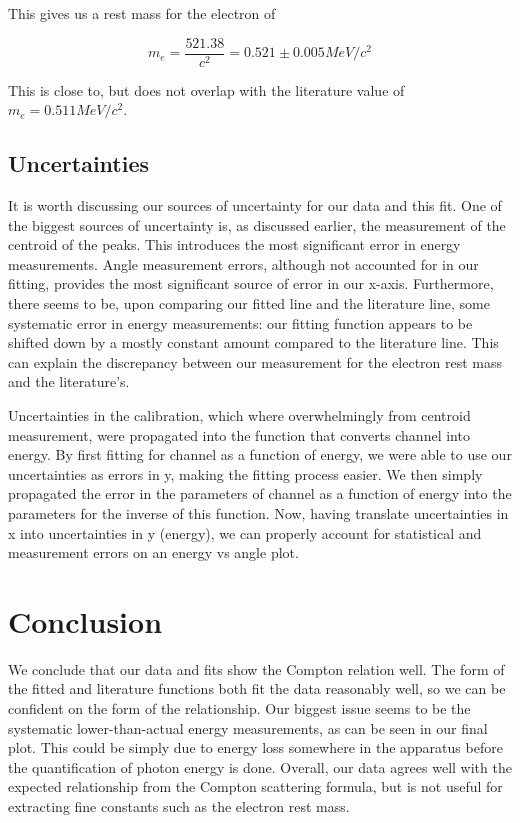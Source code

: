 \documentclass{article}
\begin{document}
This gives us a rest mass for the electron of

\begin{equation}
	m_e = \frac{521.38}{c^2} = 0.521 \pm 0.005 MeV/c^2 
\end{equation}

This is close to, but does not overlap with the literature value of $m_e = 0.511 MeV/c^2$.

\subsection{Uncertainties}
It is worth discussing our sources of uncertainty for our data and this fit. One of the biggest sources of uncertainty is, as discussed earlier, the measurement of the centroid of the peaks. This introduces the most significant error in energy measurements. Angle measurement errors, although not accounted for in our fitting, provides the most significant source of error in our x-axis. Furthermore, there seems to be, upon comparing our fitted line and the literature line, some systematic error in energy measurements: our fitting function appears to be shifted down by a mostly constant amount compared to the literature line. This can explain the discrepancy between our measurement for the electron rest mass and the literature's.

\hspace{.25cm}

Uncertainties in the calibration, which where overwhelmingly from centroid measurement, were propagated into the function that converts channel into energy. By first fitting for channel as a function of energy, we were able to use our uncertainties as errors in y, making the fitting process easier. We then simply propagated the error in the parameters of channel as a function of energy into the parameters for the inverse of this function. Now, having translate uncertainties in x into uncertainties in y (energy), we can properly account for statistical and measurement errors on an energy vs angle plot.

\section{Conclusion}

We conclude that our data and fits show the Compton relation well. The form of the fitted and literature functions both fit the data reasonably well, so we can be confident on the form of the relationship. Our biggest issue seems to be the systematic lower-than-actual energy measurements, as can be seen in our final plot. This could be simply due to energy loss somewhere in the apparatus before the quantification of photon energy is done.
Overall, our data agrees well with the expected relationship from the Compton scattering formula, but is not useful for extracting fine constants such as the electron rest mass.
\end{document}
